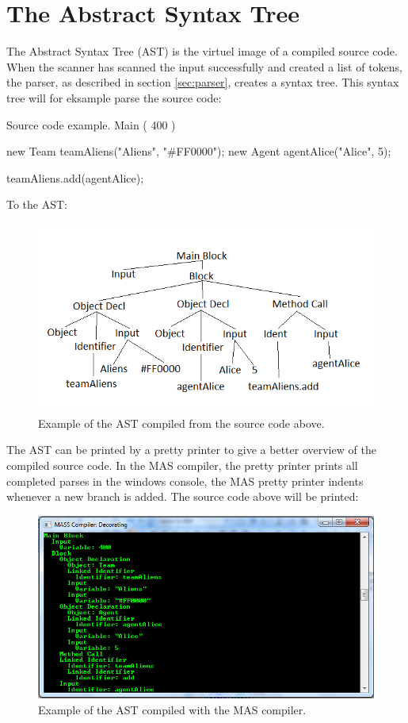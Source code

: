 \section{The Abstract Syntax Tree}
\label{AST}
The Abstract Syntax Tree (AST) is the virtuel image of a compiled source code. When the scanner has scanned the input successfully and created a list of tokens, the parser, as described in section \ref{sec:parser}, creates a syntax tree. This syntax tree will for eksample parse the source code:

\begin{source}{Source code example.}{}
Main ( 400 )
{	
	new Team teamAliens("Aliens", "#FF0000");
	new Agent agentAlice("Alice", 5);
	
	teamAliens.add(agentAlice);	
}
\end{source} 

To the AST:

\begin{figure}[H]
\begin{center}
\includegraphics[scale=0.8]{Images/ASTexample.png}
\end{center}
\caption{Example of the AST compiled from the source code above.}
\label{fig:astexample}
\end{figure}

The AST can be printed by a pretty printer to give a better overview of the compiled source code. In the MAS compiler, the pretty printer prints all completed parses in the windows console, the MAS pretty printer indents whenever a new branch is added. The source code above will be printed:

\begin{figure}[H]
\begin{center}
\includegraphics[scale=0.7]{Images/ASTMASexample.png}
\end{center}
\caption{Example of the AST compiled with the MAS compiler.}
\label{fig:astmasexample}
\end{figure}